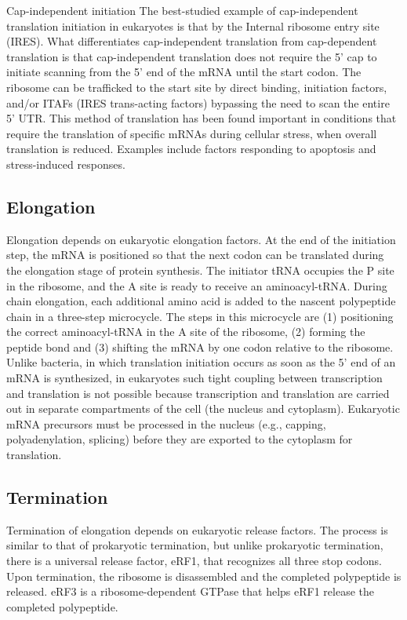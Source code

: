 Cap-independent initiation
The best-studied example of cap-independent translation initiation in eukaryotes is that by the Internal ribosome entry site (IRES). What differentiates cap-independent translation from cap-dependent translation is that cap-independent translation does not require the 5' cap to initiate scanning from the 5' end of the mRNA until the start codon. The ribosome can be trafficked to the start site by direct binding, initiation factors, and/or ITAFs (IRES trans-acting factors) bypassing the need to scan the entire 5' UTR. This method of translation has been found important in conditions that require the translation of specific mRNAs during cellular stress, when overall translation is reduced. Examples include factors responding to apoptosis and stress-induced responses.

\hypertarget{elongation-3}{%
\subsection{Elongation}\label{elongation-3}}

Elongation depends on eukaryotic elongation factors. At the end of the initiation step, the mRNA is positioned so that the next codon can be translated during the elongation stage of protein synthesis. The initiator tRNA occupies the P site in the ribosome, and the A site is ready to receive an aminoacyl-tRNA. During chain elongation, each additional amino acid is added to the nascent polypeptide chain in a three-step microcycle. The steps in this microcycle are (1) positioning the correct aminoacyl-tRNA in the A site of the ribosome, (2) forming the peptide bond and (3) shifting the mRNA by one codon relative to the ribosome. Unlike bacteria, in which translation initiation occurs as soon as the 5' end of an mRNA is synthesized, in eukaryotes such tight coupling between transcription and translation is not possible because transcription and translation are carried out in separate compartments of the cell (the nucleus and cytoplasm). Eukaryotic mRNA precursors must be processed in the nucleus (e.g., capping, polyadenylation, splicing) before they are exported to the cytoplasm for translation.

\hypertarget{termination-3}{%
\subsection{Termination}\label{termination-3}}

Termination of elongation depends on eukaryotic release factors. The process is similar to that of prokaryotic termination, but unlike prokaryotic termination, there is a universal release factor, eRF1, that recognizes all three stop codons. Upon termination, the ribosome is disassembled and the completed polypeptide is released. eRF3 is a ribosome-dependent GTPase that helps eRF1 release the completed polypeptide.

